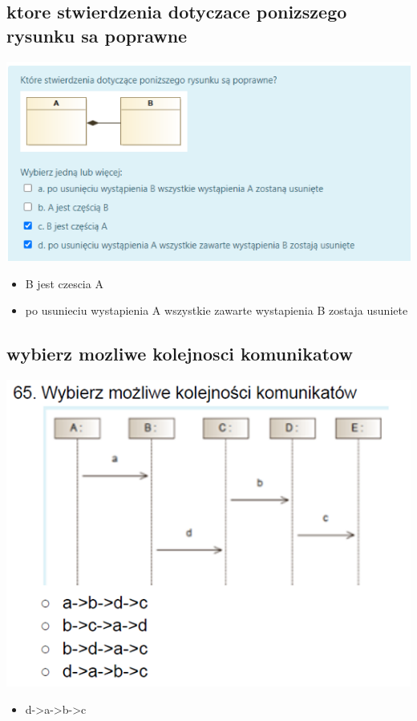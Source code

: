 \documentclass[11pt]{article}
\begin{document}
\subsection{ktore stwierdzenia dotyczace ponizszego rysunku sa poprawne}
\label{sec:org70be3c3}
\begin{center}
\includegraphics[width=.9\linewidth]{./zadanie16.png}
\end{center}
\begin{itemize}
\item B jest czescia A
\item po usunieciu wystapienia A wszystkie zawarte wystapienia B zostaja usuniete
\end{itemize}
\subsection{wybierz mozliwe kolejnosci komunikatow}
\label{sec:orgb40c4d0}
\begin{center}
\includegraphics[width=.9\linewidth]{./zadanie17.png}
\end{center}
\begin{itemize}
\item d->a->b->c
\end{itemize}
\end{document}
